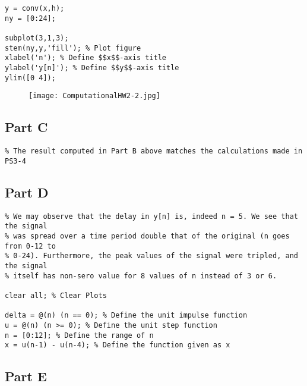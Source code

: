 \documentclass[10pt]{article}
\begin{document}
\begin{lstlisting}
y = conv(x,h);
ny = [0:24];

subplot(3,1,3);
stem(ny,y,'fill'); % Plot figure
xlabel('n'); % Define $$x$$-axis title
ylabel('y[n]'); % Define $$y$$-axis title
ylim([0 4]);
\end{lstlisting}
\begin{figure}[!ht]
\texttt{[image: ComputationalHW2-2.jpg]}
\end{figure}


{}
\subsection*{Part C}

\begin{lstlisting}
% The result computed in Part B above matches the calculations made in PS3-4
\end{lstlisting}


{}
\subsection*{Part D}

\begin{lstlisting}
% We may observe that the delay in y[n] is, indeed n = 5. We see that the signal
% was spread over a time period double that of the original (n goes from 0-12 to
% 0-24). Furthermore, the peak values of the signal were tripled, and the signal
% itself has non-sero value for 8 values of n instead of 3 or 6.

clear all; % Clear Plots

delta = @(n) (n == 0); % Define the unit impulse function
u = @(n) (n >= 0); % Define the unit step function
n = [0:12]; % Define the range of n
x = u(n-1) - u(n-4); % Define the function given as x
\end{lstlisting}


{}
\subsection*{Part E}
\end{document}
